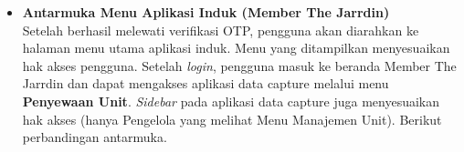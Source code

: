 \begin{itemize}




    \item \textbf{Antarmuka Menu Aplikasi Induk ({Member} The Jarrdin)}\\
    Setelah berhasil melewati verifikasi OTP, pengguna akan diarahkan ke halaman menu utama aplikasi induk. Menu yang ditampilkan menyesuaikan hak akses pengguna. Setelah \textit{login}, pengguna masuk ke beranda {Member} The Jarrdin dan dapat mengakses aplikasi data capture melalui menu \textbf{Penyewaan Unit}. \textit{Sidebar} pada aplikasi data capture juga menyesuaikan hak akses (hanya Pengelola yang melihat Menu Manajemen Unit). Berikut perbandingan antarmuka.
    

\end{itemize}
